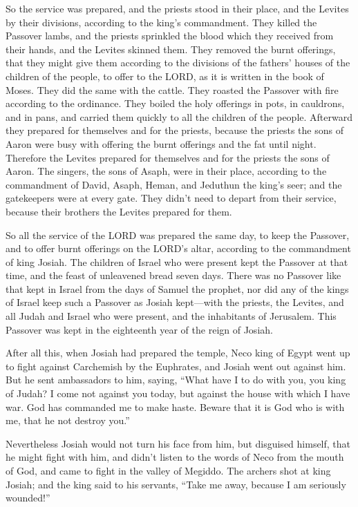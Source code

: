  So the service was prepared, and the priests stood in
their place, and the Levites by their divisions, according to the king's
commandment.  They killed the Passover lambs, and the
priests sprinkled the blood which they received from their hands, and
the Levites skinned them.  They removed the burnt
offerings, that they might give them according to the divisions of the
fathers' houses of the children of the people, to offer to the LORD, as
it is written in the book of Moses. They did the same with the cattle.
 They roasted the Passover with fire according to the
ordinance. They boiled the holy offerings in pots, in cauldrons, and in
pans, and carried them quickly to all the children of the people.
 Afterward they prepared for themselves and for the
priests, because the priests the sons of Aaron were busy with offering
the burnt offerings and the fat until night. Therefore the Levites
prepared for themselves and for the priests the sons of Aaron.
 The singers, the sons of Asaph, were in their place,
according to the commandment of David, Asaph, Heman, and Jeduthun the
king's seer; and the gatekeepers were at every gate. They didn't need to
depart from their service, because their brothers the Levites prepared
for them.

 So all the service of the LORD was prepared the same day,
to keep the Passover, and to offer burnt offerings on the LORD's altar,
according to the commandment of king Josiah.  The children
of Israel who were present kept the Passover at that time, and the feast
of unleavened bread seven days.  There was no Passover like
that kept in Israel from the days of Samuel the prophet, nor did any of
the kings of Israel keep such a Passover as Josiah kept---with the
priests, the Levites, and all Judah and Israel who were present, and the
inhabitants of Jerusalem.  This Passover was kept in the
eighteenth year of the reign of Josiah.

 After all this, when Josiah had prepared the temple, Neco
king of Egypt went up to fight against Carchemish by the Euphrates, and
Josiah went out against him.  But he sent ambassadors to
him, saying, ``What have I to do with you, you king of Judah? I come not
against you today, but against the house with which I have war. God has
commanded me to make haste. Beware that it is God who is with me, that
he not destroy you.''

 Nevertheless Josiah would not turn his face from him, but
disguised himself, that he might fight with him, and didn't listen to
the words of Neco from the mouth of God, and came to fight in the valley
of Megiddo.  The archers shot at king Josiah; and the king
said to his servants, ``Take me away, because I am seriously wounded!''

